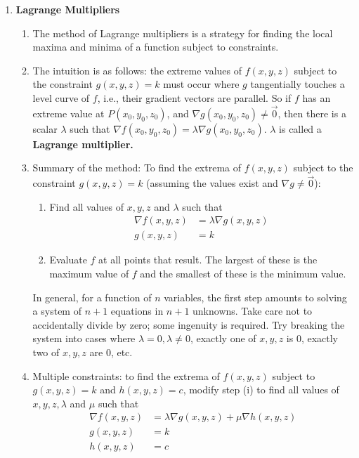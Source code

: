 \documentclass[10pt]{article}
\begin{document}
\begin{multicols}{2}
\begin{enumerate}
    \item \textbf{Lagrange Multipliers}
    \begin{enumerate}
        \item The method of Lagrange multipliers is a strategy for finding the local maxima and minima of a function subject to constraints. 
        \item The intuition is as follows: the extreme values of $f(x,y,z)$ subject to the constraint $g(x,y,z)=k$ must occur where $g$ tangentially touches a level curve of $f$, i.e., their gradient vectors are parallel. So if $f$ has an extreme value at $P(x_0, y_0, z_0)$, and $\nabla g(x_0, y_0, z_0) \neq \vec{0}$, then there is a scalar $\lambda$ such that $\nabla f(x_0, y_0, z_0) = \lambda \nabla g(x_0, y_0, z_0)$. $\lambda$ is called a \textbf{Lagrange multiplier.}
        \item Summary of the method: To find the extrema of $f(x,y,z)$ subject to the constraint $g(x,y,z)=k$ (assuming the values exist and $\nabla g \neq \vec{0}$):
        \begin{enumerate}
            \item Find all values of $x,y,z$ and $\lambda$ such that 
            \begin{align*}
                \nabla f(x, y, z) &= \lambda \nabla g(x, y, z) \\
                g(x,y,z)&=k
            \end{align*}
            \item Evaluate $f$ at all points that result. The largest of these is the maximum value of $f$ and the smallest of these is the minimum value.
        \end{enumerate}
        In general, for a function of $n$ variables, the first step amounts to solving a system of $n+1$ equations in $n+1$ unknowns. Take care not to accidentally divide by zero; some ingenuity is required. Try breaking the system into cases where $\lambda = 0, \lambda \neq 0$, exactly one of $x,y,z$ is $0$, exactly two of $x,y,z$ are $0$, etc.
        \item Multiple constraints: to find the extrema of $f(x,y,z)$ subject to $g(x,y,z)=k$ and $h(x,y,z)=c$, modify step (i) to find all values of $x,y,z,\lambda$ and $\mu$ such that
        \begin{align*}
            \nabla f(x, y, z) &= \lambda \nabla g(x, y, z) + \mu \nabla h(x,y,z) \\
            g(x,y,z) &= k \\
            h(x,y,z) &= c
        \end{align*}
    \end{enumerate}
    

\end{enumerate}
\end{multicols}
\end{document}
